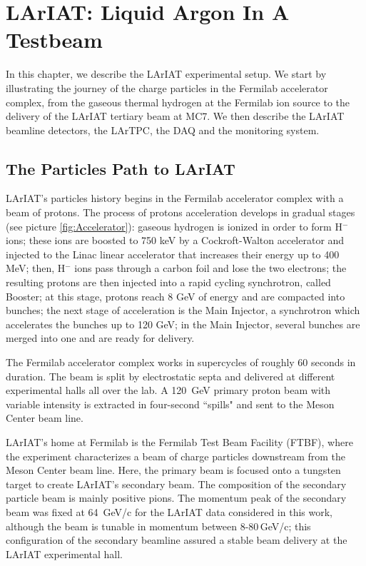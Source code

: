 
\chapter{LArIAT: Liquid Argon In A Testbeam}\label{sec:experimentDescription}
In this chapter, we describe the LArIAT experimental setup. We start by illustrating the journey of the charge particles in the Fermilab accelerator complex, from the gaseous thermal hydrogen at the Fermilab ion source to the delivery of the LArIAT tertiary beam at MC7. We  then describe the LArIAT beamline detectors, the LArTPC, the DAQ and the monitoring system.

\section{The Particles Path to LArIAT}

LArIAT's particles history begins in the Fermilab accelerator complex with a beam of protons. The process of protons acceleration develops in gradual stages (see picture \ref{fig:Accelerator}): gaseous hydrogen is ionized in order to form H$^{-}$ ions; these ions are boosted to 750 keV by a Cockroft-Walton accelerator and injected to the Linac linear accelerator that increases their energy up to 400 MeV; then, H$^{-}$ ions pass through a carbon foil and lose the two electrons; the resulting protons are then injected into a rapid cycling synchrotron, called Booster; at this stage, protons reach 8 GeV of energy and are compacted into bunches; the next stage of acceleration is the Main Injector, a synchrotron which accelerates the bunches up to 120 GeV; in the Main Injector, several bunches are merged into one and are ready for delivery.


The Fermilab accelerator complex works in supercycles of roughly 60 seconds in duration. The beam is split by electrostatic septa and delivered at different experimental halls all over the lab. A 120~GeV primary proton beam with variable intensity is extracted in four-second ``spills" and sent to the Meson Center beam line. 

LArIAT's home at Fermilab is the Fermilab Test Beam Facility (FTBF), where the experiment characterizes a beam of charge particles downstream from the Meson Center beam line. 
Here, the primary beam is focused onto a tungsten target to create LArIAT's secondary beam. The composition of the secondary particle beam is mainly positive pions. The momentum peak of the secondary beam was fixed at 64~GeV/c for the LArIAT data considered in this work, although the beam is tunable in momentum between 8-80\,GeV/c; this configuration of the secondary beamline assured a stable beam delivery at the LArIAT experimental hall.
 

